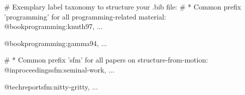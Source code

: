 # Exemplary label taxonomy to structure your .bib file:
# * Common prefix 'programming' for all programming-related material:
@book{programming:knuth97, ...}

@book{programming:gamma94, ...}

# * Common prefix 'sfm' for all papers on structure-from-motion:
@inproceedings{sfm:seminal-work, ...}

@techreport{sfm:nitty-gritty, ...}
